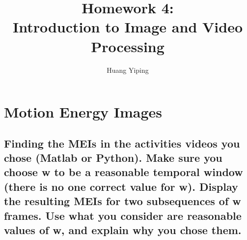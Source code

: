 \documentclass[conference]{styles/acmsiggraph}
\title{\huge Homework 4: \\ \LARGE {Introduction to Image and Video Processing}}
\author{\Large Huang Yiping \\}
\begin{document}
\maketitle


\section{Motion Energy Images}

\subsection{Finding the MEIs in the activities videos you chose (Matlab or Python). Make sure you choose w
to be a reasonable temporal window (there is no one correct value for w). Display the resulting
MEIs for two subsequences of w frames. Use what you consider are reasonable values of w, and
explain why you chose them.}
\end{document}
